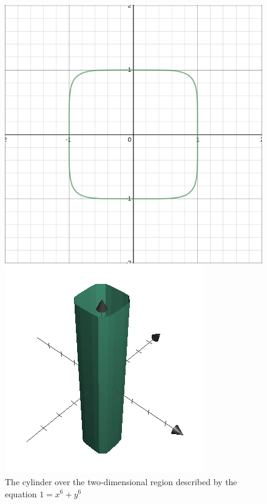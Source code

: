 \documentclass[
  digital, %
  twoside, %
  table,   %
  nolof,     %
  nolot,     %
]{fithesis3}
\begin{document}
\begin{figure}[H]
  \begin{center}
      \begin{minipage}{.4\textwidth}
          \includegraphics[width=\textwidth]{fithesis/images/likeCircle.png}
    \end{minipage}
    \begin{minipage}{.4\textwidth}
      \includegraphics[width=\textwidth]{fithesis/images/cylinder.png} 
    \end{minipage}
  \end{center}
  \caption{The cylinder over the two-dimensional region described by the equation $1 = x^6 + y^6$}
\end{figure}
\end{document}

